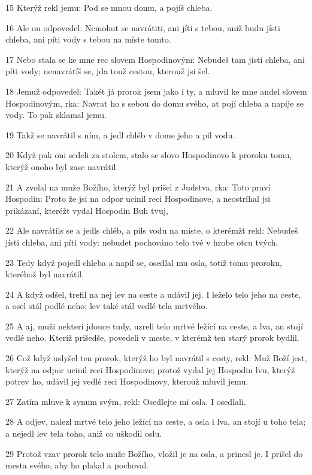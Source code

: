 \par 15 Kterýž rekl jemu: Pod se mnou domu, a pojíš chleba.
\par 16 Ale on odpovedel: Nemohut se navrátiti, ani jíti s tebou, aniž budu jísti chleba, ani píti vody s tebou na míste tomto.
\par 17 Nebo stala se ke mne rec slovem Hospodinovým: Nebudeš tam jísti chleba, ani píti vody; nenavrátíš se, jda touž cestou, kterouž jsi šel.
\par 18 Jemuž odpovedel: Takét já prorok jsem jako i ty, a mluvil ke mne andel slovem Hospodinovým, rka: Navrat ho s sebou do domu svého, at pojí chleba a napije se vody. To pak sklamal jemu.
\par 19 Takž se navrátil s ním, a jedl chléb v dome jeho a pil vodu.
\par 20 Když pak oni sedeli za stolem, stalo se slovo Hospodinovo k proroku tomu, kterýž onoho byl zase navrátil.
\par 21 A zvolal na muže Božího, kterýž byl prišel z Judstva, rka: Toto praví Hospodin: Proto že jsi na odpor ucinil reci Hospodinove, a neostríhal jsi prikázaní, kteréžt vydal Hospodin Buh tvuj,
\par 22 Ale navrátils se a jedls chléb, a pils vodu na míste, o kterémžt rekl: Nebudeš jísti chleba, ani píti vody: nebudet pochováno telo tvé v hrobe otcu tvých.
\par 23 Tedy když pojedl chleba a napil se, osedlal mu osla, totiž tomu proroku, kteréhož byl navrátil.
\par 24 A když odšel, trefil na nej lev na ceste a udávil jej. I leželo telo jeho na ceste, a osel stál podlé neho; lev také stál vedlé tela mrtvého.
\par 25 A aj, muži nekterí jdouce tudy, uzreli telo mrtvé ležící na ceste, a lva, an stojí vedlé neho. Kteríž prišedše, povedeli v meste, v kterémž ten starý prorok bydlil.
\par 26 Což když uslyšel ten prorok, kterýž ho byl navrátil s cesty, rekl: Muž Boží jest, kterýž na odpor ucinil reci Hospodinove; protož vydal jej Hospodin lvu, kterýž potrev ho, udávil jej vedlé reci Hospodinovy, kterouž mluvil jemu.
\par 27 Zatím mluve k synum svým, rekl: Osedlejte mi osla. I osedlali.
\par 28 A odjev, nalezl mrtvé telo jeho ležící na ceste, a osla i lva, an stojí u toho tela; a nejedl lev tela toho, aniž co uškodil oslu.
\par 29 Protož vzav prorok telo muže Božího, vložil je na osla, a prinesl je. I prišel do mesta svého, aby ho plakal a pochoval.
